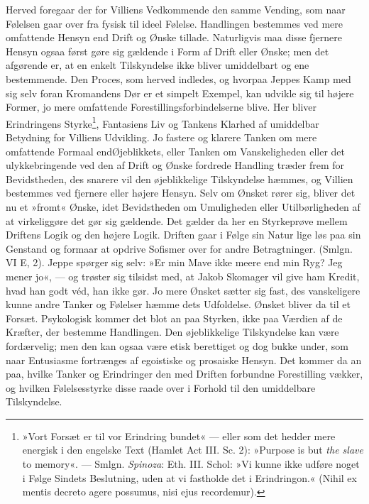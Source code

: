 \documentclass[12pt,a4paper,openany]{book}
\newcommand{\opage}[1]{\marginnote{\footnotesize\textit{[#1]}}}
\begin{document}
Herved foregaar der for Villiens Vedkommende den samme Vending, som naar
Følelsen gaar over fra fysisk til ideel Følelse. Handlingen bestemmes
ved mere omfattende Hensyn end Drift og Ønske tillade. Naturligvis maa
disse fjernere Hensyn ogsaa først gøre sig gældende i Form af Drift
eller Ønske; men det afgørende er, at en enkelt Tilskyndelse ikke bliver
umiddelbart og ene bestemmende. Den Proces, som herved indledes, og
hvorpaa Jeppes Kamp med sig selv foran Kromandens Dør er et simpelt
Exempel, kan udvikle sig til højere Former, jo mere omfattende
Forestillingsforbindelserne blive. Her bliver Erindringens
Styrke\footnote[1]{»Vort Forsæt er til vor Erindring bundet« --- eller
som det hedder mere energisk i den engelske Text (Hamlet Act III. Sc.
2): »Purpose is but \emph{the slave} to memory«. --- Smlgn.
\emph{Spinoza}: Eth. III. Schol: »Vi kunne ikke udføre noget i Følge
Sindets Beslutning, uden at vi fastholde det i Erindringon.« (Nihil ex
mentis decreto agere possumus, nisi ejus recordemur).}, Fantasiens Liv
og
\opage{383}Tankens Klarhed af umiddelbar Betydning for Villiens
Udvikling. Jo fastere og klarere Tanken om mere omfattende Formaal
endØjeblikkets, eller Tanken om Vanskeligheden eller det ulykkebringende
ved den af Drift og Ønske fordrede Handling træder frem for
Bevidstheden, des snarere vil den øjeblikkelige Tilskyndelse hæmmes, og
Villien bestemmes ved fjernere eller højere Hensyn. Selv om Ønsket rører
sig, bliver det nu et »fromt« Ønske, idet Bevidstheden om Umuligheden
eller Utilbørligheden af at virkeliggøre det gør sig gældende. Det
gælder da her en Styrkeprøve mellem Driftens Logik og den højere Logik.
Driften gaar i Følge sin Natur lige løs paa sin Genstand og formaar at
opdrive Sofismer over for andre Betragtninger. (Smlgn. VI E, 2). Jeppe
spørger sig selv: »Er min Mave ikke meere end min Ryg? Jeg mener jo«,
--- og trøster sig tilsidst med, at Jakob Skomager vil give ham Kredit,
hvad han godt véd, han ikke gør. Jo mere Ønsket sætter sig fast, des
vanskeligere kunne andre Tanker og Følelser hæmme dets Udfoldelse.
Ønsket bliver da til et Forsæt. Psykologisk kommer det blot an paa
Styrken, ikke paa Værdien af de Kræfter, der bestemme Handlingen. Den
øjeblikkelige Tilskyndelse kan være fordærvelig; men den kan ogsaa være
etisk berettiget og dog bukke under, som naar Entusiasme fortrænges af
egoistiske og prosaiske Hensyn. Det kommer da an paa, hvilke Tanker og
Erindringer den med Driften forbundne Forestilling vækker, og hvilken
Følelsesstyrke disse raade over i Forhold til den umiddelbare
Tilskyndelse.
\end{document}
